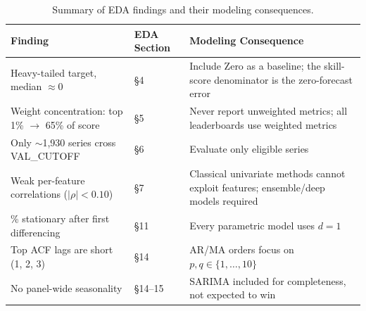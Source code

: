 \begin{table}[H]
\centering
\caption{Summary of EDA findings and their modeling consequences.}
\label{tab:eda_summary}
\begin{tabularx}{\textwidth}{>{\raggedright\arraybackslash}p{4cm}>{\raggedright\arraybackslash}p{4cm}>{\raggedright\arraybackslash}X}
\toprule
\textbf{Finding} & \textbf{EDA Section} & \textbf{Modeling Consequence} \\
\midrule
Heavy-tailed target, median $\approx 0$ & \S4 & Include Zero as a baseline; the skill-score denominator is the zero-forecast error \\
\addlinespace
Weight concentration: top 1\% $\to$ 65\% of score & \S5 & Never report unweighted metrics; all leaderboards use weighted metrics \\
\addlinespace
Only $\sim$1,930 series cross VAL\_CUTOFF & \S6 & Evaluate only eligible series \\
\addlinespace
Weak per-feature correlations ($|\rho| < 0.10$) & \S7 & Classical univariate methods cannot exploit features; ensemble/deep models required \\
\addlinespace
100\% stationary after first differencing & \S11 & Every parametric model uses $d = 1$ \\
\addlinespace
Top ACF lags are short (1, 2, 3) & \S14 & AR/MA orders focus on $p, q \in \{1, \ldots, 10\}$ \\
\addlinespace
No panel-wide seasonality & \S14--15 & SARIMA included for completeness, not expected to win \\
\bottomrule
\end{tabularx}
\end{table}
